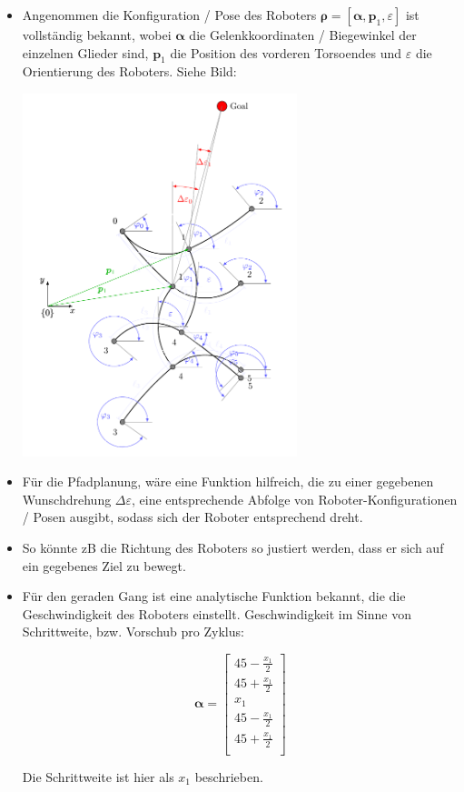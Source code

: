 \documentclass[10pt,a4paper]{article}
\begin{document}
\begin{itemize}

\item Angenommen die Konfiguration / Pose des Roboters $\bm{\rho} = [\bm{\alpha}, \bm{p}_1, \varepsilon]$ ist vollständig bekannt, wobei $\bm{\alpha}$ die Gelenkkoordinaten / Biegewinkel der einzelnen Glieder sind, $\bm{p}_1$ die Position des vorderen Torsoendes und $\varepsilon$ die Orientierung des Roboters.
Siehe Bild:

\includegraphics[width=8cm]{pics/general_model/model_vareps.pdf}


\item Für die Pfadplanung, wäre eine Funktion hilfreich, die zu einer gegebenen Wunschdrehung $\Delta \varepsilon$, eine entsprechende Abfolge von Roboter-Konfigurationen / Posen ausgibt, sodass sich der Roboter entsprechend dreht.

\item So könnte zB die Richtung des Roboters so justiert werden, dass er sich auf ein gegebenes Ziel zu bewegt.


\item Für den geraden Gang ist eine analytische Funktion bekannt, die die Geschwindigkeit des Roboters einstellt. Geschwindigkeit im Sinne von Schrittweite, bzw. Vorschub pro Zyklus:

\begin{equation}
\bm{\alpha} = \begin{bmatrix}
45 - \frac{x_1}{2} \\
45 + \frac{x_1}{2} \\
x_1 \\
45 - \frac{x_1}{2}  \\
45 + \frac{x_1}{2} \\
\end{bmatrix}
\end{equation}

Die Schrittweite ist hier als $x_1$ beschrieben.

\end{itemize}
\end{document}
